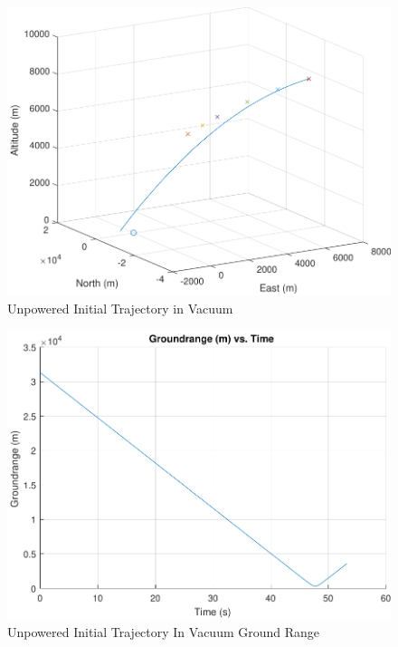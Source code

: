 \begin{figure}[H]
	\centering
	\begin{minipage}{4.5 in}
		\includegraphics[width=\linewidth]{Figures/trajunpowvac_1.pdf}
		\caption{Unpowered Initial Trajectory in Vacuum \label{fig:trajunpowvac_1} }
	\end{minipage}
\end{figure}

\begin{figure}[H]
	\centering
	\begin{minipage}{4.5 in}
		\includegraphics[width=\linewidth]{Figures/trajunpowvacgr.pdf}
		\caption{Unpowered Initial Trajectory In Vacuum Ground Range \label{fig:trajunpowgr} }
	\end{minipage}
\end{figure}

